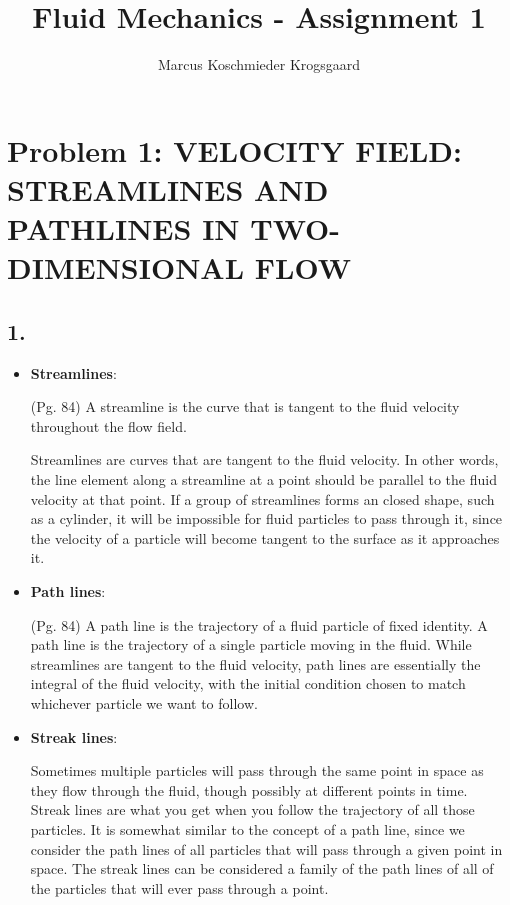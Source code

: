 \documentclass[a4paper, 12pt]{article}
\title{Fluid Mechanics - Assignment 1}
\author{Marcus Koschmieder Krogsgaard}
\begin{document}
\maketitle


\section*{Problem 1: VELOCITY FIELD: STREAMLINES AND PATHLINES IN TWO-
DIMENSIONAL FLOW}

\subsection*{1.}
\begin{itemize}
	\item \textbf{Streamlines}:
	
	(Pg. 84) A streamline is the curve that is tangent to the fluid velocity throughout the flow field.
	
	Streamlines are curves that are tangent to the fluid velocity. In other words, the line element along a streamline at a point should be parallel to the fluid velocity at that point. If a group of streamlines forms an closed shape, such as a cylinder, it will be impossible for fluid particles to pass through it, since the velocity of a particle will become tangent to the surface as it approaches it.
	
	\item \textbf{Path lines}:
	
	(Pg. 84) A path line is the trajectory of a fluid particle of fixed identity.
	A path line is the trajectory of a single particle moving in the fluid. While streamlines are tangent to the fluid velocity, path lines are essentially the integral of the fluid velocity, with the initial condition chosen to match whichever particle we want to follow.
	
	\item \textbf{Streak lines}:
	
	Sometimes multiple particles will pass through the same point in space as they flow through the fluid, though possibly at different points in time. Streak lines are what you get when you follow the trajectory of all those particles. It is somewhat similar to the concept of a path line, since we consider the path lines of all particles that will pass through a given point in space. The streak lines can be considered a family of the path lines of all of the particles that will ever pass through a point.
	
\end{itemize}
\end{document}
